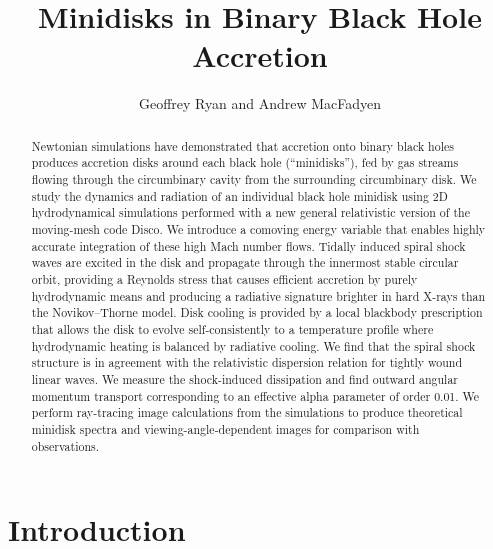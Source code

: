 \documentclass{emulateapj}
\begin{document}
\title{Minidisks in Binary Black Hole Accretion}
\author{Geoffrey Ryan and Andrew MacFadyen}

\begin{abstract}

Newtonian simulations have demonstrated that accretion onto binary black holes produces accretion disks around each black hole (``minidisks''), fed by gas streams flowing through the circumbinary cavity from the surrounding circumbinary disk. We study the dynamics and radiation of an individual black hole minidisk using 2D hydrodynamical simulations performed with a new general relativistic version of the moving-mesh code Disco. We introduce a comoving energy variable that enables highly accurate integration of these high Mach number flows. Tidally induced spiral shock waves are excited in the disk and propagate through the innermost stable circular orbit, providing a Reynolds stress that causes efficient accretion by purely hydrodynamic means and producing a radiative signature brighter in hard X-rays than the Novikov--Thorne model. Disk cooling is provided by a local blackbody prescription that allows the disk to evolve self-consistently to a temperature profile where hydrodynamic heating is balanced by radiative cooling. We find that the spiral shock structure is in agreement with the relativistic dispersion relation for tightly wound linear waves. We measure the shock-induced dissipation and find outward angular momentum transport corresponding to an effective alpha parameter of order 0.01. We perform ray-tracing image calculations from the simulations to produce theoretical minidisk spectra and viewing-angle-dependent images for comparison with observations.

\end{abstract}



\section{Introduction}
\label{sec:intro}
\end{document}
